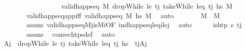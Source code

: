 \begin{isabellebody}
\ \ \ \ \ \ \ \ \ \ \ \ \ \ \ \ \ \ {\isachardoublequoteopen}valid{\isacharunderscore}{\kern0pt}happ{\isacharunderscore}{\kern0pt}seq\ M{\isacharprime}{\kern0pt}{\isacharprime}{\kern0pt}\ {\isacharparenleft}{\kern0pt}dropWhile\ {\isacharparenleft}{\kern0pt}le\ t\isactrlsub j{\isacharparenright}{\kern0pt}\ {\isacharparenleft}{\kern0pt}takeWhile\ {\isacharparenleft}{\kern0pt}leq\ t\isactrlsub j{\isacharparenright}{\kern0pt}\ hs{\isacharparenright}{\kern0pt}{\isacharparenright}{\kern0pt}\ M{\isacharprime}{\kern0pt}{\isachardoublequoteclose}\isanewline
\ \ \ \ \ \ \isamarkupfalse%
\ valid{\isacharunderscore}{\kern0pt}happ{\isacharunderscore}{\kern0pt}seq{\isacharunderscore}{\kern0pt}app{\isacharunderscore}{\kern0pt}iff\ {\isacartoucheopen}valid{\isacharunderscore}{\kern0pt}happ{\isacharunderscore}{\kern0pt}seq\ M\ {\isacharquery}{\kern0pt}hs{\isacharprime}{\kern0pt}\ M{\isacharprime}{\kern0pt}{\isacartoucheclose}\ \isamarkupfalse%
\ auto\isanewline
\ \ \ \ \isamarkupfalse%
\ \isamarkupfalse%
\ {\isachardoublequoteopen}M\ {\isacharequal}{\kern0pt}\ M{\isacharprime}{\kern0pt}{\isacharprime}{\kern0pt}{\isachardoublequoteclose}\ \isanewline
\ \ \ \ \ \ \isamarkupfalse%
\ assms\ valid{\isacharunderscore}{\kern0pt}happ{\isacharunderscore}{\kern0pt}seq{\isacharunderscore}{\kern0pt}M\isactrlsub j{\isacharunderscore}{\kern0pt}is{\isacharunderscore}{\kern0pt}M\isactrlsub i{\isacharbrackleft}{\kern0pt}OF\ ind{\isacharunderscore}{\kern0pt}happ{\isacharunderscore}{\kern0pt}seq{\isacharunderscore}{\kern0pt}leq\isactrlsub i{\isacharunderscore}{\kern0pt}le\isactrlsub j{\isacharbrackright}{\kern0pt}\ \isamarkupfalse%
\ auto\isanewline
\isanewline
\ \ \ \ \isamarkupfalse%
\ {\isachardoublequoteopen}is{\isacharunderscore}{\kern0pt}htp\ {\isasympi}s\ t\isactrlsub j{\isachardoublequoteclose}\isanewline
\ \ \ \ \ \ \isamarkupfalse%
\ assms\ \isamarkupfalse%
\ consec{\isacharunderscore}{\kern0pt}htps{\isacharunderscore}{\kern0pt}def\ \isamarkupfalse%
\ auto\isanewline
\ \ \ \ \isamarkupfalse%
\ A\isactrlsub j\ \ {\isachardoublequoteopen}dropWhile\ {\isacharparenleft}{\kern0pt}le\ t\isactrlsub j{\isacharparenright}{\kern0pt}\ {\isacharparenleft}{\kern0pt}takeWhile\ {\isacharparenleft}{\kern0pt}leq\ t\isactrlsub j{\isacharparenright}{\kern0pt}\ hs{\isacharparenright}{\kern0pt}\ {\isacharequal}{\kern0pt}\ {\isacharbrackleft}{\kern0pt}{\isacharparenleft}{\kern0pt}t\isactrlsub j{\isacharcomma}{\kern0pt}A\isactrlsub j{\isacharparenright}{\kern0pt}{\isacharbrackright}{\kern0pt}{\isachardoublequoteclose}\isanewline

\end{isabellebody}
